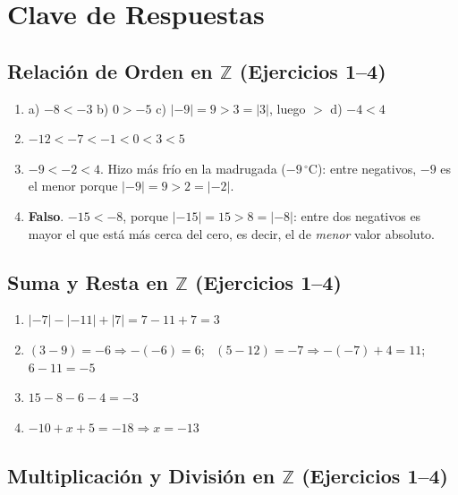\documentclass[12pt, letterpaper]{article}
\newcommand{\Z}{\mathbb{Z}}
\begin{document}
\newpage

\ifmwclaves
  \section{Clave de Respuestas}

  \subsection*{Relación de Orden en $\Z$ (Ejercicios 1--4)}

  \begin{enumerate}[leftmargin=*, label=\textbf{\arabic*.}]
    \item a) $-8 < -3$ \quad b) $0 > -5$ \quad c) $|-9| = 9 > 3 = |3|$, luego $>$ \quad d) $-4 < 4$
    \item $-12 < -7 < -1 < 0 < 3 < 5$
    \item $-9 < -2 < 4$. Hizo más frío en la madrugada ($-9\,^{\circ}$C): entre negativos, $-9$ es el menor porque $|-9| = 9 > 2 = |-2|$.
    \item \textbf{Falso}. $-15 < -8$, porque $|-15| = 15 > 8 = |-8|$: entre dos negativos es mayor el que está más cerca del cero, es decir, el de \emph{menor} valor absoluto.
  \end{enumerate}

  \subsection*{Suma y Resta en $\Z$ (Ejercicios 1--4)}

  \begin{enumerate}[leftmargin=*, label=\textbf{\arabic*.}]
    \item $|-7| - |-11| + |7| = 7 - 11 + 7 = 3$
    \item $(3 - 9) = -6 \Rightarrow -(-6) = 6$; \ $(5 - 12) = -7 \Rightarrow -(-7) + 4 = 11$; \ $6 - 11 = -5$
    \item $15 - 8 - 6 - 4 = -3$
    \item $-10 + x + 5 = -18 \Rightarrow x = -13$
  \end{enumerate}

  \subsection*{Multiplicación y División en $\Z$ (Ejercicios 1--4)}
\end{document}
